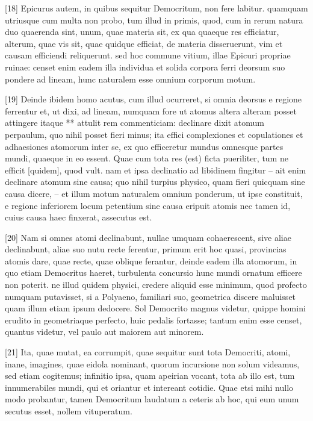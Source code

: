 \documentclass{article}
\begin{document}
[18] Epicurus autem, in quibus sequitur Democritum, non fere labitur. quamquam utriusque cum multa non probo, tum illud in primis, quod, cum in rerum natura duo quaerenda sint, unum, quae materia sit, ex qua quaeque res efficiatur, alterum, quae vis sit, quae quidque efficiat, de materia disseruerunt, vim et causam efficiendi reliquerunt. sed hoc commune vitium, illae Epicuri propriae ruinae: censet enim eadem illa individua et solida corpora ferri deorsum suo pondere ad lineam, hunc naturalem esse omnium corporum motum.

[19] Deinde ibidem homo acutus, cum illud ocurreret, si omnia deorsus e regione ferrentur et, ut dixi, ad lineam, numquam fore ut atomus altera alteram posset attingere itaque ** attulit rem commenticiam: declinare dixit atomum perpaulum, quo nihil posset fieri minus; ita effici complexiones et copulationes et adhaesiones atomorum inter se, ex quo efficeretur mundus omnesque partes mundi, quaeque in eo essent. Quae cum tota res (est) ficta pueriliter, tum ne efficit [quidem], quod vult. nam et ipsa declinatio ad libidinem fingitur -- ait enim declinare atomum sine causa; quo nihil turpius physico, quam fieri quicquam sine causa dicere, -- et illum motum naturalem omnium ponderum, ut ipse constituit, e regione inferiorem locum petentium sine causa eripuit atomis nec tamen id, cuius causa haec finxerat, assecutus est.

[20] Nam si omnes atomi declinabunt, nullae umquam cohaerescent, sive aliae declinabunt, aliae suo nutu recte ferentur, primum erit hoc quasi, provincias atomis dare, quae recte, quae oblique ferantur, deinde eadem illa atomorum, in quo etiam Democritus haeret, turbulenta concursio hunc mundi ornatum efficere non poterit. ne illud quidem physici, credere aliquid esse minimum, quod profecto numquam putavisset, si a Polyaeno, familiari suo, geometrica discere maluisset quam illum etiam ipsum dedocere. Sol Democrito magnus videtur, quippe homini erudito in geometriaque perfecto, huic pedalis fortasse; tantum enim esse censet, quantus videtur, vel paulo aut maiorem aut minorem.

[21] Ita, quae mutat, ea corrumpit, quae sequitur sunt tota Democriti, atomi, inane, imagines, quae eidola nominant, quorum incursione non solum videamus, sed etiam cogitemus; infinitio ipsa, quam apeirian vocant, tota ab illo est, tum innumerabiles mundi, qui et oriantur et intereant cotidie. Quae etsi mihi nullo modo probantur, tamen Democritum laudatum a ceteris ab hoc, qui eum unum secutus esset, nollem vituperatum.
\end{document}
